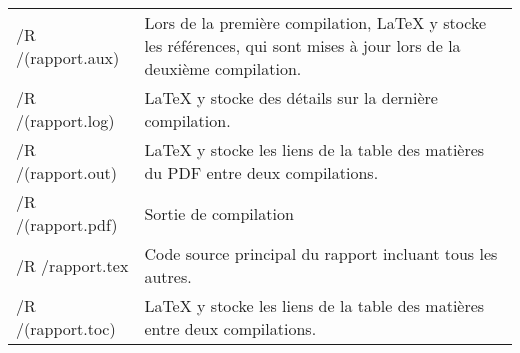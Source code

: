 \begin{onecolumn}
\begin{longtable}{>{\ttfamily}m{} p{}}
    /R /(rapport.aux)          & Lors de la première compilation,
                                 LaTeX y stocke les références, qui
                                 sont mises à jour lors de la deuxième
                                 compilation.\\
    /R /(rapport.log)          & LaTeX y stocke des détails sur la
                                 dernière compilation.\\
    /R /(rapport.out)          & LaTeX y stocke les liens de la table
                                 des matières du PDF entre deux
                                 compilations.\\
    /R /(rapport.pdf)          & Sortie de compilation\\
    /R /rapport.tex            & Code source principal du rapport
                                 incluant tous les autres.\\
    /R /(rapport.toc)          & LaTeX y stocke les liens de la table
                                 des matières entre deux
                                 compilations.\\
\end{longtable}

\end{onecolumn}

\clearpage

\twocolumn

